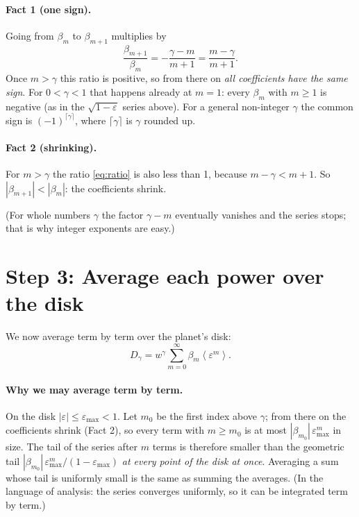 \documentclass[11pt,a4paper]{article}
\theoremstyle{remark}
\newcommand{\avg}[1]{\left\langle #1 \right\rangle}
\begin{document}
\paragraph{Fact 1 (one sign).} Going from $\beta_m$ to $\beta_{m+1}$ multiplies by
\begin{equation}
  \frac{\beta_{m+1}}{\beta_m}=-\frac{\gamma-m}{m+1}=\frac{m-\gamma}{m+1}.
  \label{eq:ratio}
\end{equation}
Once $m>\gamma$ this ratio is positive, so from there on \emph{all coefficients have the same
sign}. For $0<\gamma<1$ that happens already at $m=1$: every $\beta_m$ with $m\ge1$ is negative
(as in the $\sqrt{1-\varepsilon}$ series above). For a general non-integer $\gamma$ the common sign
is $(-1)^{\lceil\gamma\rceil}$, where $\lceil\gamma\rceil$ is $\gamma$ rounded up.

\paragraph{Fact 2 (shrinking).} For $m>\gamma$ the ratio \eqref{eq:ratio} is also less than 1,
because $m-\gamma<m+1$. So $|\beta_{m+1}|<|\beta_m|$: the coefficients shrink.

(For whole numbers $\gamma$ the factor $\gamma-m$ eventually vanishes and the series stops; that
is why integer exponents are easy.)

\section{Step 3: Average each power over the disk}

We now average term by term over the planet's disk:
\begin{equation}
  D_\gamma=w^\gamma\sum_{m=0}^\infty\beta_m\avg{\varepsilon^m}.
  \label{eq:series}
\end{equation}

\paragraph{Why we may average term by term.} On the disk $|\varepsilon|\le\varepsilon_{\max}<1$.
Let $m_0$ be the first index above $\gamma$; from there on the coefficients shrink (Fact 2), so
every term with $m\ge m_0$ is at most $|\beta_{m_0}|\,\varepsilon_{\max}^m$ in size. The tail of the
series after $m$ terms is therefore smaller than the geometric tail
$|\beta_{m_0}|\,\varepsilon_{\max}^{m}/(1-\varepsilon_{\max})$ \emph{at every point of the disk at
once}. Averaging a sum whose tail is uniformly small is the same as
summing the averages. (In the language of analysis: the series converges uniformly, so it can be
integrated term by term.)
\end{document}
